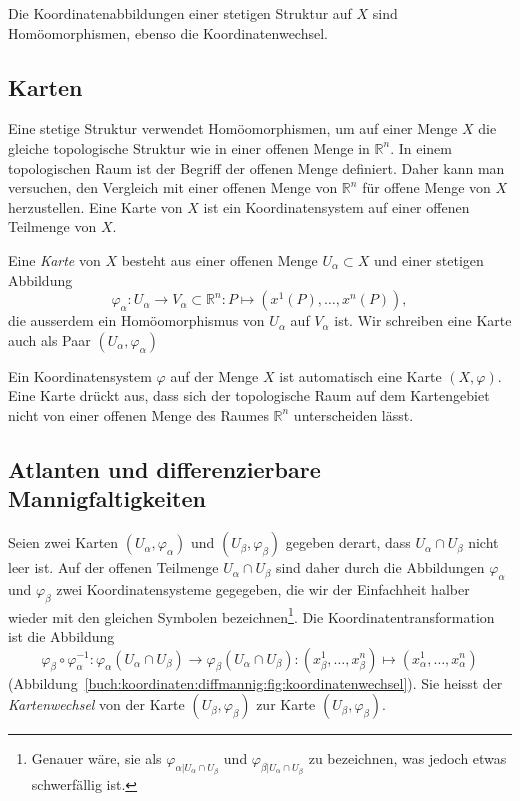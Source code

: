 Die Koordinatenabbildungen einer stetigen Struktur auf $X$ sind
Homöomorphismen, ebenso die Koordinatenwechsel.

%
%
\subsection{Karten}
Eine stetige Struktur verwendet Homöomorphismen, um auf einer Menge $X$
die gleiche topologische Struktur wie in einer offenen Menge in
$\mathbb{R}^n$.
In einem topologischen Raum ist der Begriff der offenen Menge definiert.
Daher kann man versuchen, den Vergleich mit einer offenen Menge von
$\mathbb{R}^n$ für offene Menge von $X$ herzustellen.
Eine Karte von $X$ ist ein Koordinatensystem auf einer offenen Teilmenge
von $X$.

\begin{definition}[Karte]
Eine {\em Karte} von $X$ besteht aus einer offenen Menge $U_\alpha\subset X$
und einer stetigen Abbildung
\[
\varphi_\alpha
\colon
U_\alpha\to V_\alpha\subset\mathbb{R}^n
:
P
\mapsto
(x^1(P),\dots,x^n(P)),
\]
die ausserdem ein Homöomorphismus von $U_\alpha$ auf $V_\alpha$ ist.
Wir schreiben eine Karte auch als Paar $(U_\alpha,\varphi_\alpha)$
%
\end{definition}

Ein Koordinatensystem $\varphi$ auf der Menge $X$ ist automatisch eine
Karte $(X,\varphi)$.
Eine Karte drückt aus, dass sich der topologische Raum auf dem
Kartengebiet nicht von einer offenen Menge des Raumes $\mathbb{R}^n$
unterscheiden lässt.

%
%
\subsection{Atlanten und differenzierbare Mannigfaltigkeiten}
%
Seien zwei Karten $(U_\alpha,\varphi_\alpha)$ und $(U_\beta,\varphi_\beta)$
gegeben derart, dass $U_\alpha\cap U_\beta$ nicht leer ist.
Auf der offenen Teilmenge $U_\alpha\cap U_\beta$ sind daher durch
die Abbildungen $\varphi_\alpha$ und $\varphi_\beta$ zwei
Koordinatensysteme gegegeben, die wir der Einfachheit halber wieder
mit den gleichen Symbolen bezeichnen\footnote{Genauer wäre, sie als
$\varphi_{\alpha|U_\alpha\cap U_\beta}$ und
$\varphi_{\beta|U_\alpha\cap U_\beta}$ zu bezeichnen, was jedoch
etwas schwerfällig ist.}.
Die Koordinatentransformation ist die Abbildung
\[
\varphi_\beta\circ\varphi_\alpha^{-1}
\colon
\varphi_\alpha(U_\alpha\cap U_\beta)
\to
\varphi_\beta(U_\alpha\cap U_\beta)
:
(x_\beta^1,\dots,x_\beta^n)
\mapsto
(x_\alpha^1,\dots,x_\alpha^n)
\]
(Abbildung~\ref{buch:koordinaten:diffmannig:fig:koordinatenwechsel}).
Sie heisst der {\em Kartenwechsel} von der Karte $(U_\beta,\varphi_\beta)$
zur Karte $(U_\beta,\varphi_\beta)$.
%


